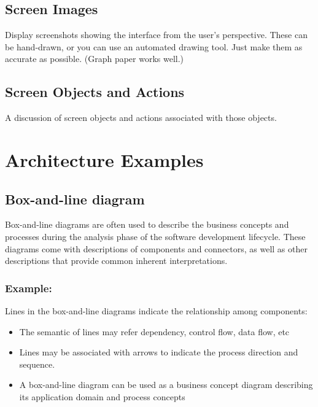 \documentclass[12pt,a4paper]{report}
\begin{document}
\section{Screen Images}

Display screenshots showing the interface from the user's perspective. These can be hand-drawn, or you can use an automated drawing tool. Just make them as accurate as possible. (Graph paper works well.)

\section{Screen Objects and Actions}

A discussion of screen objects and actions associated with those objects.

\appendix

\chapter{Architecture Examples}

\section{Box-and-line diagram}

Box-and-line diagrams are often used to describe the business concepts and processes during the analysis phase of the software development lifecycle. These diagrams come with descriptions of components and connectors, as well as other descriptions that provide common inherent interpretations.

\subsection*{Example:}

Lines in the box-and-line diagrams indicate the relationship among components:

\begin{itemize}
    \item The semantic of lines may refer dependency, control flow, data flow, etc
    \item Lines may be associated with arrows to indicate the process direction and sequence.
    \item A box-and-line diagram can be used as a business concept diagram describing its application domain and process concepts
\end{itemize}
\end{document}
